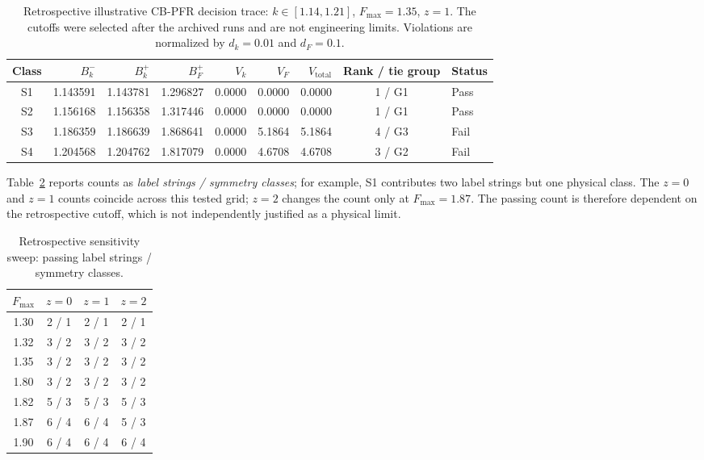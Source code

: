 \documentclass[conference]{IEEEtran}
\begin{document}
\begin{table}[t]
\caption{Retrospective illustrative CB-PFR decision trace: $k\in[1.14,1.21]$, $F_{\max}=1.35$, $z=1$. The cutoffs were selected after the archived runs and are not engineering limits. Violations are normalized by $d_k=0.01$ and $d_F=0.1$.}
\label{tab:screen}
\centering
\scriptsize
\setlength{\tabcolsep}{5pt}
\begin{tabular}{c r r r r r r c l}
\toprule
Class & $B_k^-$ & $B_k^+$ & $B_F^+$ & $V_k$ & $V_F$ & $V_{\mathrm{total}}$ & Rank / tie group & Status\\
\midrule
S1 & 1.143591 & 1.143781 & 1.296827 & 0.0000 & 0.0000 & 0.0000 & 1 / G1 & Pass\\
S2 & 1.156168 & 1.156358 & 1.317446 & 0.0000 & 0.0000 & 0.0000 & 1 / G1 & Pass\\
S3 & 1.186359 & 1.186639 & 1.868641 & 0.0000 & 5.1864 & 5.1864 & 4 / G3 & Fail\\
S4 & 1.204568 & 1.204762 & 1.817079 & 0.0000 & 4.6708 & 4.6708 & 3 / G2 & Fail\\
\bottomrule
\end{tabular}
\end{table}

Table~\ref{tab:sweep} reports counts as \emph{label strings / symmetry classes}; for example, S1 contributes two label strings but one physical class. The \(z=0\) and \(z=1\) counts coincide across this tested grid; \(z=2\) changes the count only at \(F_{\max}=1.87\). The passing count is therefore dependent on the retrospective cutoff, which is not independently justified as a physical limit.

\begin{table}[t]
\caption{Retrospective sensitivity sweep: passing label strings / symmetry classes.}
\label{tab:sweep}
\centering
\scriptsize
\setlength{\tabcolsep}{3pt}
\begin{tabular}{c c c c}
\toprule
\(F_{\max}\) & \(z=0\) & \(z=1\) & \(z=2\)\\
\midrule
1.30 & 2 / 1 & 2 / 1 & 2 / 1\\
1.32 & 3 / 2 & 3 / 2 & 3 / 2\\
1.35 & 3 / 2 & 3 / 2 & 3 / 2\\
1.80 & 3 / 2 & 3 / 2 & 3 / 2\\
1.82 & 5 / 3 & 5 / 3 & 5 / 3\\
1.87 & 6 / 4 & 6 / 4 & 5 / 3\\
1.90 & 6 / 4 & 6 / 4 & 6 / 4\\
\bottomrule
\end{tabular}
\end{table}
\end{document}
